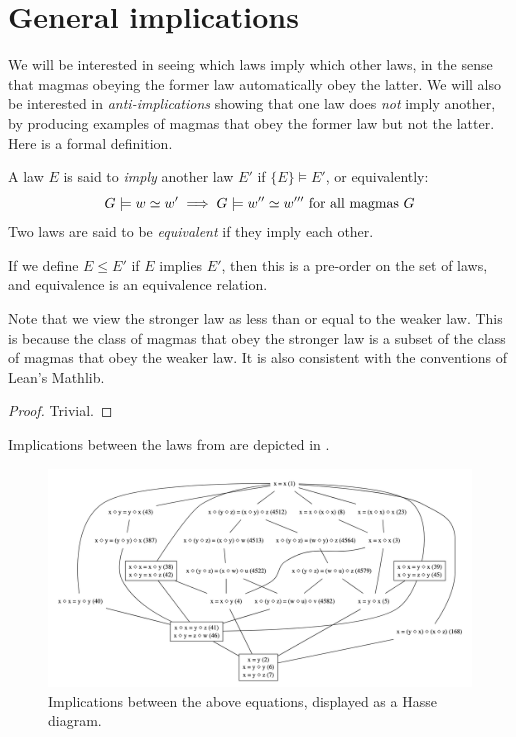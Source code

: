 \chapter{General implications}\label{generla-implications-chapter}
We will be interested in seeing which laws imply which other laws, in the sense that magmas obeying the former law automatically obey the latter. We will also be interested in \emph{anti-implications} showing that one law does \emph{not} imply another, by producing examples of magmas that obey the former law but not the latter. Here is a formal definition.

\begin{definition}[Implication]\label{impl}
  A law $E$ is said to \emph{imply} another law $E'$ if $\{E\} \models E'$, or equivalently:
  $$ G \models w  \simeq  w' \implies G \models w''  \simeq  w''' \hbox{ for all magmas } G$$
  Two laws are said to be \emph{equivalent} if they imply each other.
\end{definition}

\begin{lemma}\leanok\label{pre-order}
  If we define $E \leq E'$ if $E$ implies $E'$, then this is a pre-order on the set of laws, and equivalence is an equivalence relation.
\end{lemma}

Note that we view the stronger law as less than or equal to the weaker law. This is because the class of magmas that obey the stronger law is a subset of the class of magmas that obey the weaker law. It is also consistent with the conventions of Lean's Mathlib.

\begin{proof}\leanok
  Trivial.
\end{proof}

Implications between the laws from  are depicted in .

\begin{figure}
  \centering
  \includegraphics[width=1\linewidth]{../../images/subgraph.png}
  \caption{Implications between the above equations, displayed as a Hasse diagram.}
  \label{fig:implications}
\end{figure}

